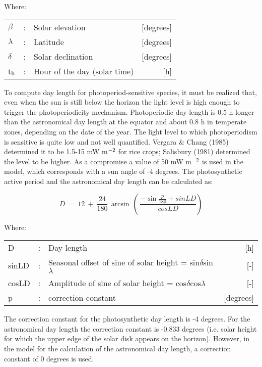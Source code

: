 Where:\\[5pt]
\begin{tabularx}{\textwidth}{llXr}
	$\beta$ &:& Solar elevation  & [degrees]\\
	$\lambda$ &:& Latitude  & [degrees]\\
	$\delta$ &:& Solar declination  & [degrees]\\
	t$_{{\rm h}}$ &:& Hour of the day (solar time)  & [h]\\
\end{tabularx}

To compute day length for photoperiod-sensitive species, it must be realized that, even
when the sun is still below the horizon the light level is high enough to trigger the
photoperiodicity mechan\-ism. Photoperiodic day length is 0.5 h longer than the 
astronomi\-cal day length at the equator and about 0.8 h in temperate zones, depending 
on the date of the year. The light level to which photoperiodism is sensitive is quite low and not well
quantified. Vergara \& Chang (1985) determined it to be 1.5-15 mW m$^{{\rm -2}}$ for 
rice crops; Salisbury (1981) determined the level to be higher. As a compromise a value of 50 mW
m$^{{\rm -2}}$ is used in the model, which corresponds with a sun angle of -4 degrees. The
photosynthetic active period and the astro\-nomical day length can be calculated as:

\begin{equation}
\label{eq:AstroDaylength}
D ~=~ 12~+~{\frac{24}{180}} \, \arcsin \, (\,{\frac{-\sin {\frac{p}{180}} + sinLD}{cosLD}} )
\end{equation}

Where:\\[5pt]
\begin{tabularx}{\textwidth}{llXr}
	D &:& Day length  & [h]\\
	sinLD &:& Seasonal offset of sine of solar height = sin$\delta$sin$\lambda$  & [-]\\
	cosLD &:& Amplitude of sine of solar height = cos$\delta$cos$\lambda$  & [-]\\
	p &:& correction constant  & [degrees]\\
\end{tabularx}

The correction constant for the photosynthetic day length is -4 degrees. For the astronomical 
day length the correction constant is -0.833 degrees (i.e. solar height for which
the upper edge of the solar disk appears on the horizon). However, in the model for the
calculation of the astronomical day length, a correction constant of 0 degrees is used. 

